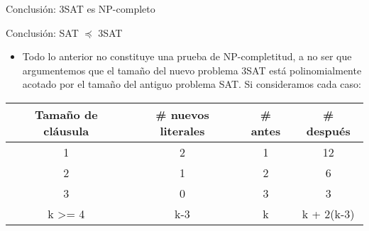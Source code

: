 \documentclass[10pt, mathserif, profesionalfont]{beamer}
\begin{document}
\begin{frame}{Conclusión: 3SAT es NP-completo}
\begin{block}{Conclusión: SAT $\preceq$ 3SAT}   
\begin{itemize}
\item{Todo lo anterior no constituye una prueba de NP-completitud, a no ser que argumentemos que el tamaño del nuevo problema 3SAT está polinomialmente acotado por el tamaño del antiguo problema SAT. \newline \newline Si consideramos cada caso:}
\end{itemize}
\begin{table}[]
\centering

\begin{tabular}{cccc}
\hline
\multicolumn{1}{|c|}{\textbf{Tamaño de cláusula}} & \multicolumn{1}{c|}{\textbf{\# nuevos literales}} & \multicolumn{1}{c|}{\textbf{\# antes}} & \multicolumn{1}{c|}{\textbf{\# después}} \\ \hline
1                                                 & 2                                                 & 1                                      & 12                                       \\
2                                                 & 1                                                 & 2                                      & 6                                        \\
3                                                 & 0                                                 & 3                                      & 3                                        \\
k \textgreater= 4                                 & k-3                                               & k                                      & k + 2(k-3)                              
\end{tabular}
\end{table}
\end{block}

\end{frame}
\end{document}
